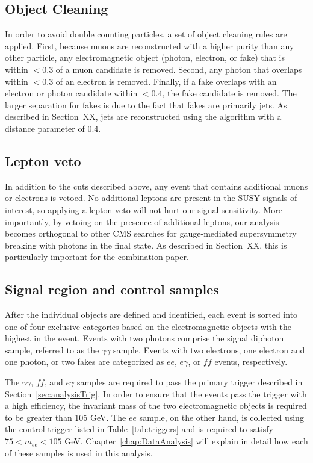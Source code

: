 \subsection{Object Cleaning}
\label{sec:ObjCleaning}

In order to avoid double counting particles, a set of object cleaning rules are applied. 
First, because muons are reconstructed with a higher purity than any other particle, 
any electromagnetic object (photon, electron, or fake) that is within \dR $< 0.3$ of a muon candidate is removed.
Second, any photon that overlaps within \dR $< 0.3$ of an electron is removed. Finally, if a fake overlaps with an electron or 
photon candidate within \dR $< 0.4$, the fake candidate is removed. The larger \dR separation for fakes is due to the fact
that fakes are primarily jets. As described in Section~XX, jets are reconstructed using the \antikt algorithm with a distance
parameter of 0.4.  

\subsection{Lepton veto}
\label{sec:lepVeto}

In addition to the cuts described above, any event that contains additional muons or electrons is vetoed. 
No additional leptons are present in the SUSY signals of interest, so applying a lepton veto will not hurt our signal sensitivity.
More importantly, by vetoing on the presence of additional leptons, our analysis becomes orthogonal to other CMS searches for
gauge-mediated supersymmetry breaking with photons in the final state. As described in Section~XX, this is particularly
important for the combination paper.

\subsection{Signal region and control samples}
\label{sec:samples}
After the individual objects are defined and identified, each event is sorted into one of four exclusive categories based on the electromagnetic objects with the highest \pT in the event. Events with two photons comprise the signal diphoton sample, referred to as the $\gamma\gamma$ sample. Events with two electrons, one electron and one photon, or two fakes are categorized as $ee$, $e\gamma$, or $ff$ events, respectively. 

The  $\gamma\gamma$, $ff$, and $e\gamma$ samples are required to pass the primary trigger described in Section~\ref{sec:analysisTrig}. 
In order to ensure that the events pass the trigger with a high efficiency, the invariant mass of the two electromagnetic objects is required to be greater than 105 GeV. 
The $ee$ sample, on the other hand, is collected using the control trigger listed in Table~\ref{tab:triggers} and is required to satisfy $75 < m_{ee} < 105$ GeV. Chapter~\ref{chap:DataAnalysis} will explain in detail how each of these samples is used in this analysis.


